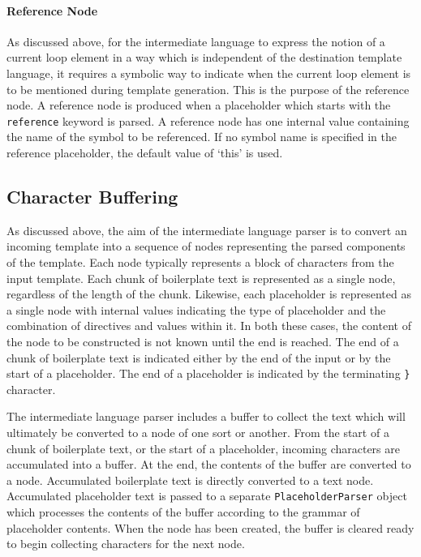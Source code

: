 \paragraph{Reference Node}

As discussed above, for the intermediate language to express the notion of a current loop element in a way which is independent of the destination template language, it requires a symbolic way to indicate when the current loop element is to be mentioned during template generation. This is the purpose of the reference node. A reference node is produced when a placeholder which starts with the \verb!reference! keyword is parsed. A reference node has one internal value containing the name of the symbol to be referenced. If no symbol name is specified in the reference placeholder, the default value of `this' is used.

\paragraph{}

\subsection*{Character Buffering}
\label{gilt:parser:buffering}

As discussed above, the aim of the intermediate language parser is to convert an incoming template into a sequence of nodes representing the parsed components of the template. Each node typically represents a block of characters from the input template. Each chunk of boilerplate text is represented as a single node, regardless of the length of the chunk. Likewise, each placeholder is represented as a single node with internal values indicating the type of placeholder and the combination of directives and values within it. In both these cases, the content of the node to be constructed is not known until the end is reached. The end of a chunk of boilerplate text is indicated either by the end of the input or by the start of a placeholder. The end of a placeholder is indicated by the terminating \verb!}! character.

The intermediate language parser includes a buffer to collect the text which will ultimately be converted to a node of one sort or another. From the start of a chunk of boilerplate text, or the start of a placeholder, incoming characters are accumulated into a buffer. At the end, the contents of the buffer are converted to a node. Accumulated boilerplate text is directly converted to a text node. Accumulated placeholder text is passed to a separate \verb!PlaceholderParser! object which processes the contents of the buffer according to the grammar of placeholder contents. When the node has been created, the buffer is cleared ready to begin collecting characters for the next node.

